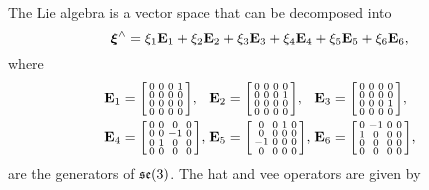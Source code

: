 The Lie algebra is a vector space that can be decomposed into
\begin{equation}
  {\boldsymbol{\mathbf{\xi}}}^\wedge = \xi_1 {\boldsymbol{\mathbf{E}}}_1 + \xi_2 {\boldsymbol{\mathbf{E}}}_2 + \xi_3 {\boldsymbol{\mathbf{E}}}_3 + \xi_4 {\boldsymbol{\mathbf{E}}}_4 + \xi_5 {\boldsymbol{\mathbf{E}}}_5 + \xi_6 {\boldsymbol{\mathbf{E}}}_6,
\end{equation}
where
\begin{equation}
\begin{alignedat}{3}
  &{\boldsymbol{\mathbf{E}}}_1 =
  \begin{bsmallmatrix}
    0 & 0 & 0 & 1\\
    0 & 0 & 0 & 0\\
    0 & 0 & 0 & 0\\
    0 & 0 & 0 & 0
  \end{bsmallmatrix}, \;
  &&{\boldsymbol{\mathbf{E}}}_2 =
  \begin{bsmallmatrix}
    0 & 0 & 0 & 0\\
    0 & 0 & 0 & 1\\
    0 & 0 & 0 & 0\\
    0 & 0 & 0 & 0
  \end{bsmallmatrix}, \;
  &&{\boldsymbol{\mathbf{E}}}_3 =
  \begin{bsmallmatrix}
    0 & 0 & 0 & 0\\
    0 & 0 & 0 & 0\\
    0 & 0 & 0 & 1\\
    0 & 0 & 0 & 0
  \end{bsmallmatrix},\\
  &{\boldsymbol{\mathbf{E}}}_4 =
  \begin{bsmallmatrix}
    0 & 0 & 0 & 0\\
    0 & 0 & -1 & 0\\
    0 & 1 & 0 & 0\\
    0 & 0 & 0 & 0
  \end{bsmallmatrix}, \;
  &&{\boldsymbol{\mathbf{E}}}_5 =
  \begin{bsmallmatrix}
    0 & 0 & 1 & 0\\
    0 & 0 & 0 & 0\\
    -1 & 0 & 0 & 0\\
    0 & 0 & 0 & 0
  \end{bsmallmatrix}, \;
  &&{\boldsymbol{\mathbf{E}}}_6 =
  \begin{bsmallmatrix}
    0 & -1 & 0 & 0\\
    1 & 0 & 0 & 0\\
    0 & 0 & 0 & 0\\
    0 & 0 & 0 & 0
  \end{bsmallmatrix},
\end{alignedat}
\end{equation}
are the generators of ${\mathfrak {se}}(3)$. The hat and vee operators are given by
